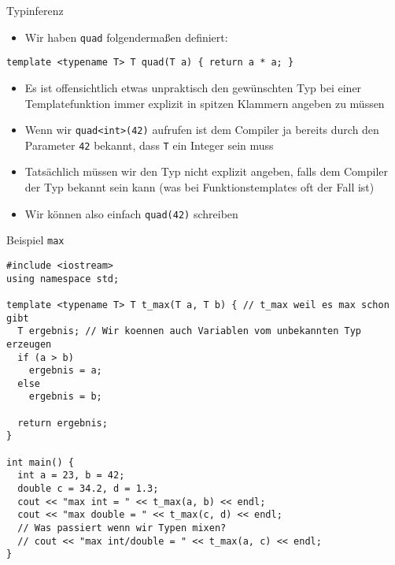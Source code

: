 \documentclass[presentation]{beamer}
\begin{document}
\begin{frame}[fragile,label={sec:org01320fc}]{Typinferenz}
 \begin{itemize}
\item Wir haben {\color{solarizedYellow}\texttt{quad} }folgendermaßen definiert:
\end{itemize}
\begin{verbatim}
template <typename T> T quad(T a) { return a * a; }
\end{verbatim}
\begin{itemize}
\item Es ist offensichtlich etwas unpraktisch den gewünschten Typ bei
einer Templatefunktion immer explizit in spitzen Klammern angeben zu
müssen
\item Wenn wir {\color{solarizedYellow}\texttt{quad<int>(42)} }aufrufen ist dem Compiler ja bereits durch
den Parameter {\color{solarizedYellow}\texttt{42} }bekannt, dass {\color{solarizedYellow}\texttt{T} }ein Integer sein muss
\item Tatsächlich müssen wir den Typ nicht explizit angeben, falls dem
Compiler der Typ bekannt sein kann (was bei Funktionstemplates oft
der Fall ist)
\item Wir können also einfach {\color{solarizedYellow}\texttt{quad(42)} }schreiben
\end{itemize}
\end{frame}
\begin{frame}[fragile,label={sec:org26c9a4c}]{Beispiel {\color{solarizedYellow}\texttt{max}}}
 \begin{verbatim}
#include <iostream>
using namespace std;

template <typename T> T t_max(T a, T b) { // t_max weil es max schon gibt
  T ergebnis; // Wir koennen auch Variablen vom unbekannten Typ erzeugen
  if (a > b)
    ergebnis = a;
  else
    ergebnis = b;

  return ergebnis;
}

int main() {
  int a = 23, b = 42;
  double c = 34.2, d = 1.3;
  cout << "max int = " << t_max(a, b) << endl;
  cout << "max double = " << t_max(c, d) << endl;
  // Was passiert wenn wir Typen mixen?
  // cout << "max int/double = " << t_max(a, c) << endl;
}
\end{verbatim}
\end{frame}
\end{document}
